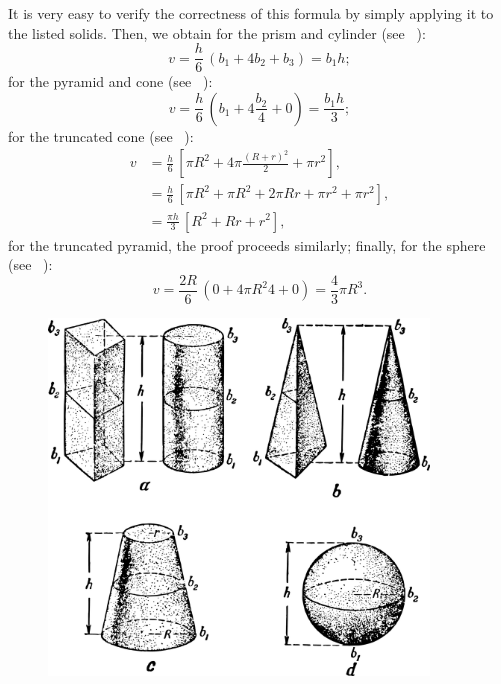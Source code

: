 \ans It is very easy to verify the correctness of this formula by simply applying it to the listed solids. Then, we obtain for the prism and cylinder (see ~):
\begin{equation*}%
v = \frac{h}{6}\, (b_{1} + 4b_{2} + b_{3}) = b_{1}h;
\end{equation*}
for the pyramid and cone (see ~):
\begin{equation*}%
v = \frac{h}{6}\, (b_{1} + 4\frac{b_{2}}{4} + 0) = \frac{b_{1}h}{3};
\end{equation*}
for the truncated cone (see ~):
\begin{align*}%
v & = \frac{h}{6}\, \left[ \pi R^{2} + 4 \pi \frac{(R + r)^{2}}{2} + \pi r^{2} \right], \\ 
& = \frac{h}{6}\, \left[ \pi R^{2} + \pi R^{2} + 2 \pi Rr +  \pi r^{2} + \pi r^{2} \right], \\ 
& = \frac{\pi h}{3}\, \left[ R^{2} + Rr + r^{2}\right],
\end{align*}
for the truncated pyramid, the proof proceeds similarly; finally, for the sphere (see ~):
\begin{equation*}%
v = \frac{2R}{6}\, (0 + 4 \pi R^{2}{4} + 0) = \frac{4}{3}\pi R^{3}.
\end{equation*}

\begin{figure}[h!]
\centering
\includegraphics[width=0.9\textwidth]{figures/ch-01/fig-01-17.pdf}
\end{figure}

